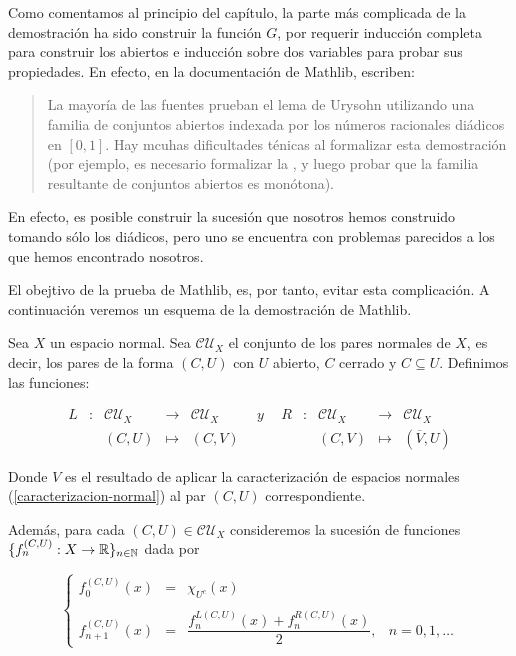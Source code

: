 Como comentamos al principio del capítulo, la parte más complicada de la demostración ha sido construir la función $G$, por requerir inducción completa para construir los abiertos e inducción sobre dos variables para probar sus propiedades. En efecto, en la documentación de Mathlib, escriben:

\begin{quote}
  La mayoría de las fuentes prueban el lema de Urysohn utilizando una familia de conjuntos abiertos indexada por los números racionales diádicos en $[0, 1]$. Hay mcuhas dificultades ténicas al formalizar esta demostración (por ejemplo, es necesario formalizar la , y luego probar que la familia resultante de conjuntos abiertos es monótona).
\end{quote}

En efecto, es posible construir la sucesión que nosotros hemos construido tomando sólo los diádicos, pero uno se encuentra con problemas parecidos a los que hemos encontrado nosotros.

El obejtivo de la prueba de Mathlib, es, por tanto, evitar esta complicación. A continuación veremos un esquema de la demostración de Mathlib.

Sea $X$ un espacio normal. Sea $\mathcal{CU}_X$ el conjunto de los pares normales de $X$, es decir, los pares de la forma $(C, U)$ con $U$ abierto, $C$ cerrado y $C \subseteq U$. Definimos las funciones:

$$
\begin{array}{ccrclcccrcl}
  L & : & \mathcal{CU}_X & \longrightarrow & \mathcal{CU}_X & ~~y~~ & R & : & \mathcal{CU}_X & \longrightarrow & \mathcal{CU}_X \\
  & & (C, U) & \longmapsto & (C, V) & & & & (C, V) & \longmapsto & (\overline{V}, U)
\end{array}
$$

Donde $V$ es el resultado de aplicar la caracterización de espacios normales (\ref{caracterizacion-normal}) al par $(C, U)$ correspondiente.

Además, para cada $(C, U) \in \mathcal{CU}_X$ consideremos la sucesión de funciones $\{f_n^{(C, U)} : X \to \mathbb{R}\}_{n\in \mathbb{N}}$ dada por

$$
\left\{
\begin{array}{lclc}
  f_0^{(C, U)}(x)  & = & \chi_{U^c}(x) & \\
  & & & \\
  f_{n+1}^{(C, U)}(x) & = & \dfrac{f_n^{L(C, U)}(x) + f_n^{R(C, U)}(x)}{2}, & n = 0, 1, \dots
\end{array}
\right.
$$

